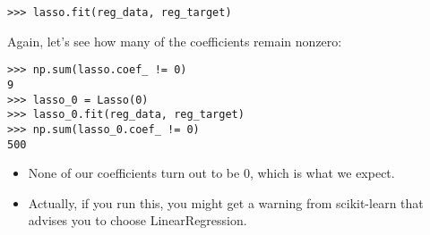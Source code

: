 \documentclass[SKL-MASTER.tex]{subfiles}
\begin{document}
\begin{framed}
	\begin{verbatim}
>>> lasso.fit(reg_data, reg_target)
\end{verbatim}
\end{framed}
Again, let's see how many of the coefficients remain nonzero:
\begin{framed}
\begin{verbatim}
>>> np.sum(lasso.coef_ != 0)
9
>>> lasso_0 = Lasso(0)
>>> lasso_0.fit(reg_data, reg_target)
>>> np.sum(lasso_0.coef_ != 0)
500
\end{verbatim}
\end{framed}
\begin{itemize}
\item None of our coefficients turn out to be 0, which is what we expect. 
\item Actually, if you run this, you
might get a warning from scikit-learn that advises you to choose LinearRegression.
\end{itemize}


\newpage
\end{document}
